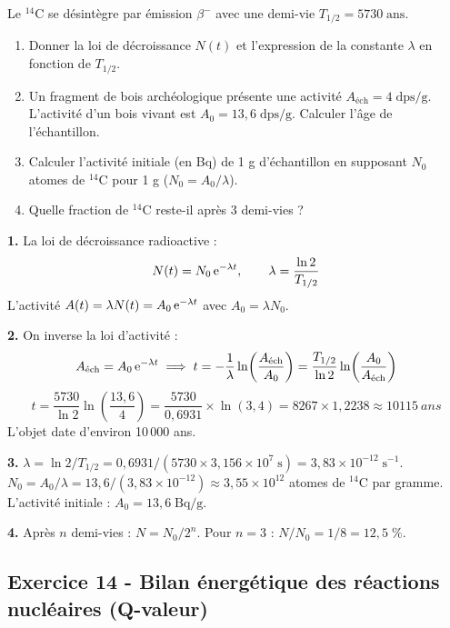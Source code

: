 \documentclass[12pt,a4paper]{article}
\begin{document}
\begin{boiteexercice}
Le ${}^{14}$C se désintègre par émission $\beta^-$ avec une demi-vie $T_{1/2}=5730\;\text{ans}$.
\begin{enumerate}
  \item Donner la loi de décroissance $N(t)$ et l'expression de la constante $\lambda$ en fonction de $T_{1/2}$.
  \item Un fragment de bois archéologique présente une activité $A_\text{éch}=4\;\text{dps/g}$. L'activité d'un bois vivant est $A_0=13{,}6\;\text{dps/g}$. Calculer l'âge de l'échantillon.
  \item Calculer l'activité initiale (en Bq) de 1 g d'échantillon en supposant $N_0$ atomes de ${}^{14}$C pour 1 g ($N_0 = A_0/\lambda$).
  \item Quelle fraction de ${}^{14}$C reste-il après 3 demi-vies ?
\end{enumerate}
\end{boiteexercice}

\begin{boitecorrige}
\textbf{1.} La loi de décroissance radioactive :
\[
N(t) = N_0\,\mathrm{e}^{-\lambda t}, \qquad \lambda = \frac{\ln 2}{T_{1/2}}
\]
L'activité $A(t) = \lambda N(t) = A_0\,\mathrm{e}^{-\lambda t}$ avec $A_0=\lambda N_0$.

\textbf{2.} On inverse la loi d'activité :
\[
A_\text{éch} = A_0\,\mathrm{e}^{-\lambda t} \implies t = -\frac{1}{\lambda}\ln\!\left(\frac{A_\text{éch}}{A_0}\right) = \frac{T_{1/2}}{\ln 2}\ln\!\left(\frac{A_0}{A_\text{éch}}\right)
\]
\[
t = \frac{5730}{\ln 2}\ln\!\left(\frac{13{,}6}{4}\right) = \frac{5730}{0{,}6931}\times\ln(3{,}4) = 8267\times1{,}2238 \approx \qty{10115}{ans}
\]
L'objet date d'environ 10\,000 ans.

\textbf{3.} $\lambda = \ln2/T_{1/2} = 0{,}6931/(5730\times3{,}156\times10^7\;\text{s}) = 3{,}83\times10^{-12}\;\text{s}^{-1}$.
$N_0 = A_0/\lambda = 13{,}6/(3{,}83\times10^{-12}) \approx 3{,}55\times10^{12}$ atomes de ${}^{14}$C par gramme.
L'activité initiale : $A_0 = 13{,}6\;\text{Bq/g}$.

\textbf{4.} Après $n$ demi-vies : $N = N_0/2^n$. Pour $n=3$ : $N/N_0 = 1/8 = 12{,}5\;\%$.
\end{boitecorrige}

\subsection*{Exercice 14 - Bilan énergétique des réactions nucléaires (Q-valeur) \niveau{\moyen}}
\end{document}
